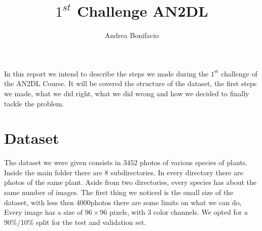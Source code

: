 \documentclass[a4paper,12pt]{article}
\numberwithin{equation}{section}
\begin{document}
\title{\(1^{st}\) Challenge AN2DL}
\author{Andrea Bonifacio}
\maketitle
In this report we intend to describe the steps we made during the \(1^{\text{st}}\) challenge of the AN2DL Course. It will be covered the structure of the dataset, the first steps we made, what we did right, what we did wrong and how we decided to finally tackle the problem.
\section*{Dataset}
The dataset we were given consists in \(3452\) photos of various species of plants. Inside the main folder there are \(8\) subdirectories. In every directory there are photos of the same plant. Aside from two directories, every species has about the same number of images. The first thing we noticed is the small size of the dataset, with less then \(4000\)photos there are some limits on what we can do, Every image has a size of \(96 \times 96\) pixels, with \(3\) color channels. We opted for a 90\%/10\% split for the test and validation set.
\end{document}
